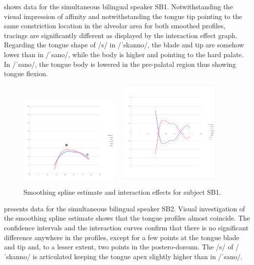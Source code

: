 \documentclass[output=paper]{LSP/langsci}
\begin{document}
 shows data for the simultaneous bilingual speaker SB1. Notwithstanding the visual impression of affinity and notwithstanding the tongue tip pointing to the same constriction location in the alveolar area for both smoothed profiles, tracings are significantly different as displayed by the interaction effect graph. Regarding the tongue shape of /s/ in /ˈskanno/, the blade and tip are somehow lower than in /ˈsano/, while the body is higher and pointing to the hard palate. In /ˈsano/, the tongue body is lowered in the pre-palatal region thus showing tongue flexion.
  
\begin{figure}[t]
\includegraphics[width=0.45\textwidth]{illustrations/sprea_fig3a}~
\includegraphics[width=0.45\textwidth,trim=4 68 4 32,clip]{illustrations/sprea_fig3b}
\caption{Smoothing spline estimate and interaction effects for subject SB1.}
\label{fig:3}  
\end{figure}

 presents data for the simultaneous bilingual speaker SB2. Visual investigation of the smoothing spline estimate shows that the tongue profiles almost coincide. The confidence intervals and the interaction curves confirm that there is no significant difference anywhere in the profiles, except for a few points at the tongue blade and tip and, to a lesser extent, two points in the postero-dorsum. The /s/ of /ˈskanno/ is articulated keeping the tongue apex slightly higher than in /ˈsano/.
  
\end{document}
